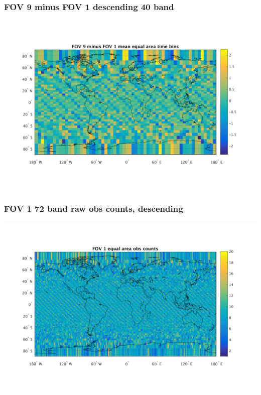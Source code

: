 \documentclass[11pt]{beamer}
\begin{document}
\begin{frame}
\frametitle{FOV 9 minus FOV 1 descending 40 band}
\begin{center}
  \includegraphics[scale=0.5]{slackfigs/FOV_9_minus_1_40_bin_desc.png}
\end{center}
\end{frame} %
\begin{frame}
\frametitle{FOV 1 72 band raw obs counts, descending}
\begin{center}
  \includegraphics[scale=0.5]{slackfigs/FOV_1_72_bin_desc_counts.png}
\end{center}
\end{frame} %
\end{document}
